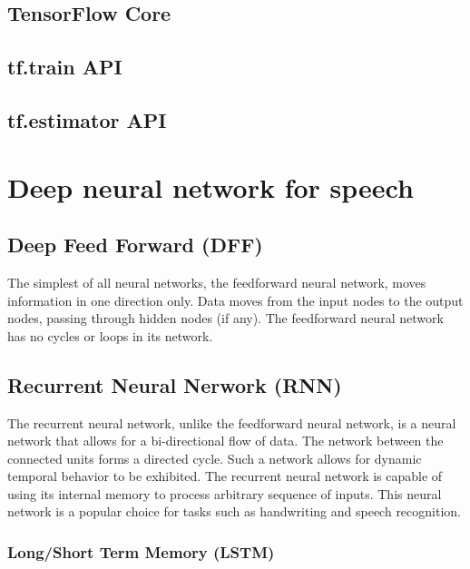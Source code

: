 \subsection{TensorFlow Core}

\subsection{tf.train API}

\subsection{tf.estimator API}

\section{Deep neural network for speech}

\subsection{Deep Feed Forward (DFF)}
The simplest of all neural networks, the feedforward neural network, moves information in one direction only. Data moves from the input nodes to the output nodes, passing through hidden nodes (if any). The feedforward neural network has no cycles or loops in its network.

\subsection{Recurrent Neural Nerwork (RNN)}
The recurrent neural network, unlike the feedforward neural network, is a neural network that allows for a bi-directional flow of data. The network between the connected units forms a directed cycle. Such a network allows for dynamic temporal behavior to be exhibited. The recurrent neural network is capable of using its internal memory to process arbitrary sequence of inputs. This neural network is a popular choice for tasks such as handwriting and speech recognition.

\subsubsection{Long/Short Term Memory (LSTM)}
